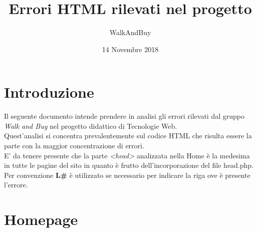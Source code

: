 



\title{\textbf{Errori HTML rilevati nel progetto}}
\author{WalkAndBuy}

\date{14 Novembre 2018}




\makeFrontPage

\tableofcontents

\newpage

\section{Introduzione}
Il seguente documento intende prendere in analisi gli errori rilevati dal gruppo \textit{Walk and Buy} nel progetto didattico di Tecnologie Web.\\
Quest'analisi si concentra prevalentemente sul codice HTML che risulta essere la parte con la maggior concentrazione di errori.
\\
E’ da tenere presente che la parte \textit{<head>} analizzata nella Home è la medesima in tutte le pagine del sito in quanto è frutto dell’incorporazione del file head.php.\\
Per convenzione \textbf{L\#} è utilizzato se necessario per indicare la riga ove è presente l’errore.

\section{Homepage}

